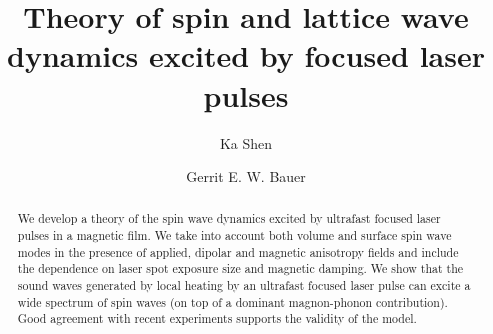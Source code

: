 \documentclass[aps,prb,twocolumn,superscriptaddress,floatfix]{revtex4}%
\begin{document}
\title{Theory of spin and lattice wave dynamics excited by focused laser pulses}
\author{Ka Shen}


\author{Gerrit E. W. Bauer}

\begin{abstract}
We develop a theory of the spin wave dynamics excited by ultrafast focused laser pulses in a magnetic film. We take into account both volume and surface spin wave modes in the presence of applied, dipolar and magnetic anisotropy fields and include the dependence on laser spot exposure size and magnetic damping. We show that the sound waves generated by local heating by an ultrafast focused laser pulse can excite a wide spectrum of spin waves (on top of a dominant magnon-phonon contribution). Good agreement with recent experiments supports the validity of the model.
\end{abstract}

\maketitle
%

%
% 

%
\end{document}
